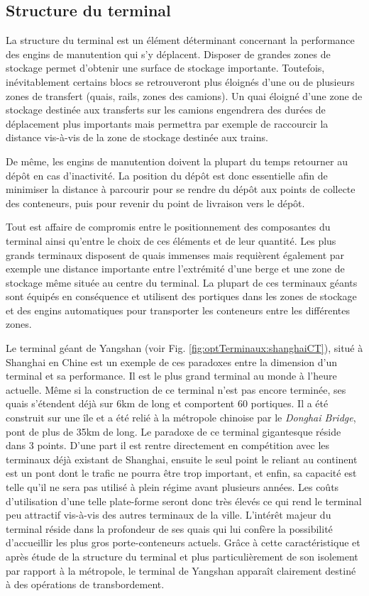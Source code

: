 \subsection{Structure du terminal}

La structure du terminal est un élément déterminant concernant la performance des engins de manutention qui s'y déplacent. Disposer de grandes zones de stockage permet d'obtenir une surface de stockage importante. Toutefois, inévitablement certains blocs se retrouveront plus éloignés d'une ou de plusieurs zones de transfert (quais, rails, zones des camions). Un quai éloigné d'une zone de stockage destinée aux transferts sur les camions engendrera des durées de déplacement plus importants mais permettra par exemple de raccourcir la distance vis-à-vis de la zone de stockage destinée aux trains.

De même, les engins de manutention doivent la plupart du temps retourner au dépôt en cas d'inactivité. La position du dépôt est donc essentielle afin de minimiser la distance à parcourir pour se rendre du dépôt aux points de collecte des conteneurs, puis pour revenir du point de livraison vers le dépôt.

Tout est affaire de compromis entre le positionnement des composantes du terminal ainsi qu'entre le choix de ces éléments et de leur quantité. Les plus grands terminaux disposent de quais immenses mais requièrent également par exemple une distance importante entre l'extrémité d'une berge et une zone de stockage même située au centre du terminal. La plupart de ces terminaux géants sont équipés en conséquence et utilisent des portiques dans les zones de stockage et des engins automatiques pour transporter les conteneurs entre les différentes zones.

Le terminal géant de Yangshan (voir Fig. \ref{fig:optTerminaux:shanghaiCT}), situé à Shanghai en Chine est un exemple de ces paradoxes entre la dimension d'un terminal et sa performance. Il est le plus grand terminal au monde à l'heure actuelle. Même si la construction de ce terminal n'est pas encore terminée, ses quais s'étendent déjà sur 6km de long et comportent 60 portiques. Il a été construit sur une île et a été relié à la métropole chinoise par le \textit{Donghai Bridge}, pont de plus de 35km de long. Le paradoxe de ce terminal gigantesque réside dans 3 points. D'une part il est rentre directement en compétition avec les terminaux déjà existant de Shanghai, ensuite le seul point le reliant au continent est un pont dont le trafic ne pourra être trop important, et enfin, sa capacité est telle qu'il ne sera pas utilisé à plein régime avant plusieurs années. Les coûts d'utilisation d'une telle plate-forme seront donc très élevés ce qui rend le terminal peu attractif vis-à-vis des autres terminaux de la 
ville. L'intérêt majeur du terminal réside dans la profondeur de ses quais qui lui confère la possibilité d'accueillir les plus gros porte-conteneurs actuels. Grâce à cette caractéristique et après étude de la structure du terminal et plus particulièrement de son isolement par rapport à la métropole, le terminal de Yangshan apparaît clairement destiné à des opérations de transbordement.


